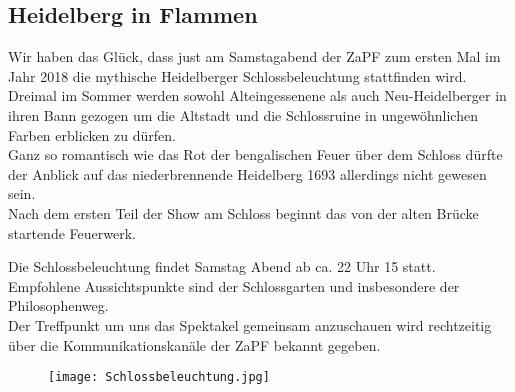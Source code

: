 \subsection*{Heidelberg in Flammen} %

Wir haben das Glück, dass just am Samstagabend der ZaPF zum ersten Mal im Jahr 2018 die mythische Heidelberger Schlossbeleuchtung stattfinden wird.\\
Dreimal im Sommer werden sowohl Alteingessenene als auch Neu-Heidelberger in ihren Bann gezogen um die Altstadt und die Schlossruine in ungewöhnlichen Farben erblicken zu dürfen.\\
Ganz so romantisch wie das Rot der bengalischen Feuer über dem Schloss dürfte der Anblick auf das niederbrennende Heidelberg 1693 allerdings nicht gewesen sein.\\Nach dem ersten Teil der Show am Schloss beginnt das von der alten Brücke startende Feuerwerk. 

Die Schlossbeleuchtung findet Samstag Abend ab ca. 22 Uhr 15 statt. Empfohlene Aussichtspunkte sind der Schlossgarten und insbesondere der Philosophenweg. \\
Der Treffpunkt um uns das Spektakel gemeinsam anzuschauen wird rechtzeitig über die Kommunikationskanäle der ZaPF bekannt gegeben.
\begin{figure}
\centering
\texttt{[image: Schlossbeleuchtung.jpg]}
\end{figure}